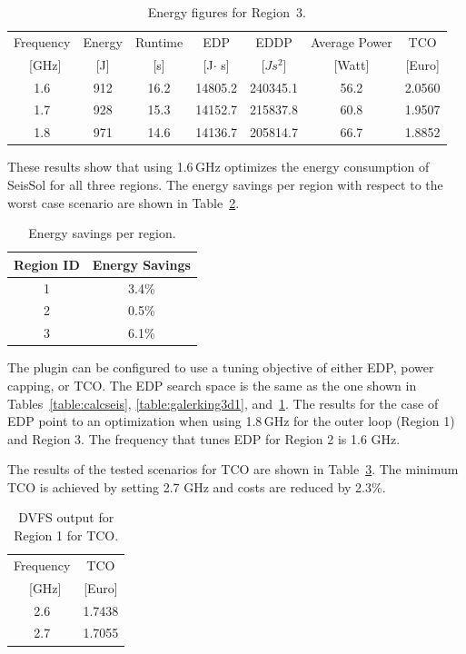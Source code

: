 \begin{table}[H]
\centering
\begin{tabular}{|c |c |c |c |c |c |c|}
\hline
Frequency & Energy & Runtime & EDP          & EDDP      & Average Power & TCO \\
~[GHz]  & [J]  & [s]   & [J$\cdot$ s] & [$Js^2$]  & [Watt]        & [Euro] \\
\hline\hline
1.6       & 912   & 16.2  & 14805.2  & 240345.1 & 56.2       & 2.0560\\
1.7       & 928   & 15.3  & 14152.7  & 215837.8 & 60.8       & 1.9507\\
1.8       & 971   & 14.6  & 14136.7  & 205814.7 & 66.7       & 1.8852\\
\hline
\end{tabular}
	\caption{Energy figures for Region~3.}
	\label{table:galerking3d2}
\end{table}

These results show that using 1.6\,GHz optimizes the energy consumption of SeisSol for all three regions. The energy savings per region with respect to the worst case scenario are shown in Table~\ref{table:regionsavings}.

\begin{table}[H]
 \centering
 \begin{tabular}{| c | c | }
  \hline
  Region ID & Energy Savings \\\hline\hline
      1     &  3.4\%         \\\hline
      2     &  0.5\%    \\\hline
      3     &  6.1\%	\\
  \hline
 \end{tabular}
 \caption{Energy savings per region.}
 \label{table:regionsavings}
\end{table}

The plugin can be configured to use a tuning objective of either EDP, power capping, or TCO.  The EDP search space is the same as the one shown in Tables~\ref{table:calcseis}, \ref{table:galerking3d1}, and~\ref{table:galerking3d2}. The results for the case of EDP point to an optimization when using 1.8\,GHz for the outer loop (Region 1) and Region 3. The frequency that tunes EDP for Region 2 is 1.6 GHz.

The results of the tested scenarios for TCO are shown in Table~\ref{table:seissol_tco}. The minimum TCO is achieved by setting 2.7 GHz and costs are reduced by 2.3\%.

\begin{table}[H]
\centering
\begin{tabular}{|c |c|}
\hline
Frequency & TCO \\
~[GHz]  & [Euro] \\
\hline\hline
2.6       & 1.7438 \\
2.7       & 1.7055 \\
\hline
\end{tabular}
	\caption{DVFS output for Region 1 for TCO.}
	\label{table:seissol_tco}
\end{table}

